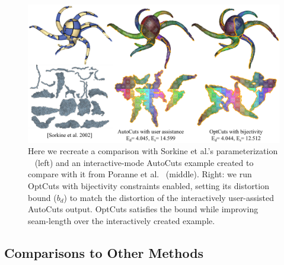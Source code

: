 \begin{figure}[t]
\centering
\includegraphics[width=\linewidth]{fig/comp_AutoCuts_Olga.png}
\vspace{-0.5cm}
\caption{Here we recreate a comparison with Sorkine et al.'s parameterization \  (left) and an interactive-mode AutoCuts example created to compare with it from Poranne et al.\  (middle). 
Right: we run OptCuts with bijectivity constraints enabled, setting its distortion bound ($b_d$) to match the distortion of the interactively user-assisted AutoCuts output. OptCuts satisfies the bound while improving seam-length over the interactively created example.}
\vspace{-0.5cm}
\label{fig:comp_AutoCuts_Olga}
\end{figure}

\subsection{Comparisons to Other Methods}
\label{sec:cmpr_other}

